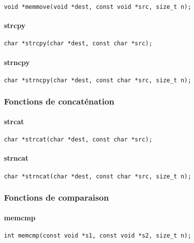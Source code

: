\begin{Verbatim}
void *memmove(void *dest, const void *src, size_t n);
\end{Verbatim}

\paragraph{strcpy}

\begin{Verbatim}
char *strcpy(char *dest, const char *src);
\end{Verbatim}

\paragraph{strncpy}

\begin{Verbatim}
char *strncpy(char *dest, const char *src, size_t n);
\end{Verbatim}

\subsubsection{Fonctions de concaténation}

\paragraph{strcat}
\begin{Verbatim}
char *strcat(char *dest, const char *src);
\end{Verbatim}
\paragraph{strncat}
\begin{Verbatim}
char *strncat(char *dest, const char *src, size_t n);
\end{Verbatim}

\subsubsection{Fonctions de comparaison}

\paragraph{memcmp}
\begin{Verbatim}
int memcmp(const void *s1, const void *s2, size_t n);
\end{Verbatim}
